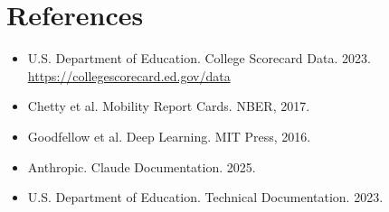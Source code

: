\documentclass[11pt]{article}
\begin{document}
\section{References}

\begin{itemize}
\item U.S. Department of Education. College Scorecard Data. 2023. \url{https://collegescorecard.ed.gov/data}
\item Chetty et al. Mobility Report Cards. NBER, 2017.
\item Goodfellow et al. Deep Learning. MIT Press, 2016.
\item Anthropic. Claude Documentation. 2025.
\item U.S. Department of Education. Technical Documentation. 2023.
\end{itemize}
\end{document}

